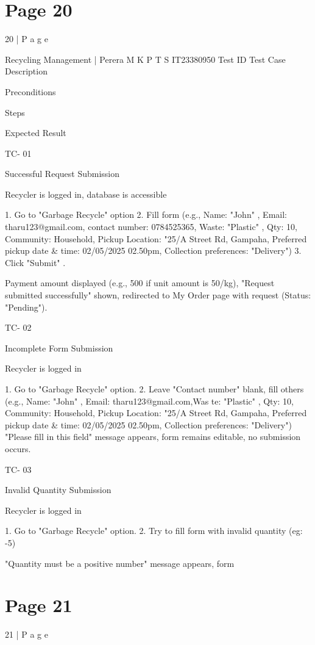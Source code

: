 \documentclass{article}
\begin{document}
\section*{Page 20}
20 | P a g e 
 
 
Recycling Management |  Perera M K P T S  
IT23380950 
Test 
ID 
Test Case 
Description 
 
Preconditions 
 
Steps 
 
Expected 
Result 
 
TC-
01 
 
Successful 
Request 
Submission 
 
Recycler is logged 
in, database is 
accessible 
 
1. Go to "Garbage Recycle" 
option 2. Fill form (e.g., 
Name: "John" , Email: 
tharu123@gmail.com, 
contact number: 
0784525365, Waste: 
"Plastic" , Qty: 10,  
Community: Household, 
Pickup Location: "25/A 
Street Rd, Gampaha, 
Preferred pickup date \& 
time: 02/05/2025 
02.50pm, Collection 
preferences: "Delivery") 
3. Click "Submit" . 
 
Payment 
amount 
displayed (e.g., 
500 if unit 
amount is 
50/kg), "Request 
submitted 
successfully" 
shown, 
redirected to My 
Order page with 
request (Status: 
"Pending"). 
 
TC-
02 
 
Incomplete 
Form 
Submission 
 
Recycler is logged 
in 
 
1. Go to "Garbage Recycle" 
option. 
2. Leave "Contact 
number" blank, fill others 
(e.g., Name: "John" , Email: 
tharu123@gmail.com,Was
te: "Plastic" , Qty: 10,  
Community: Household, 
Pickup Location: "25/A 
Street Rd, Gampaha, 
Preferred pickup date \& 
time: 02/05/2025 
02.50pm, Collection 
preferences: "Delivery") 
"Please fill in this 
field" message 
appears, form 
remains 
editable, no 
submission 
occurs. 
 
TC-
03 
 
Invalid 
Quantity 
Submission 
 
Recycler is logged 
in 
 
1. Go to "Garbage Recycle" 
option. 
2. Try to  fill form with 
invalid quantity (eg: -5) 
 
"Quantity must 
be a positive 
number" 
message 
appears, form 

\section*{Page 21}
21 | P a g e 
 
\end{document}
